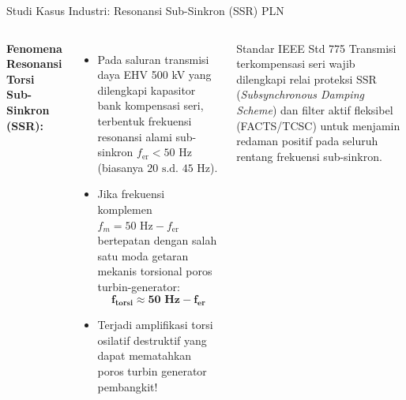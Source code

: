 \documentclass[aspectratio=169,10pt]{beamer}
\begin{document}
\begin{frame}{Studi Kasus Industri: Resonansi Sub-Sinkron (SSR) PLN}
  \begin{columns}[c]
    \textbf{Fenomena Resonansi Torsi Sub-Sinkron (SSR):}
    \begin{itemize}
      \item Pada saluran transmisi daya EHV 500 kV yang dilengkapi kapasitor bank kompensasi seri, terbentuk frekuensi resonansi alami sub-sinkron $f_{\text{er}} < 50\text{ Hz}$ (biasanya $20\text{ s.d. } 45\text{ Hz}$).
      \item Jika frekuensi komplemen $f_m = 50\text{ Hz} - f_{\text{er}}$ bertepatan dengan salah satu moda getaran mekanis torsional poros turbin-generator:
      \begin{equation*}
        \mathbf{f_{\text{torsi}} \approx 50\text{ Hz} - f_{\text{er}}}
      \end{equation*}
      \item Terjadi amplifikasi torsi osilatif destruktif yang dapat mematahkan poros turbin generator pembangkit!
    \end{itemize}

    \begin{alertblock}{Standar IEEE Std 775}
      Transmisi terkompensasi seri wajib dilengkapi relai proteksi SSR (\textit{Subsynchronous Damping Scheme}) dan filter aktif fleksibel (FACTS/TCSC) untuk menjamin redaman positif pada seluruh rentang frekuensi sub-sinkron.
    \end{alertblock}
  \end{columns}
\end{frame}
\end{document}

